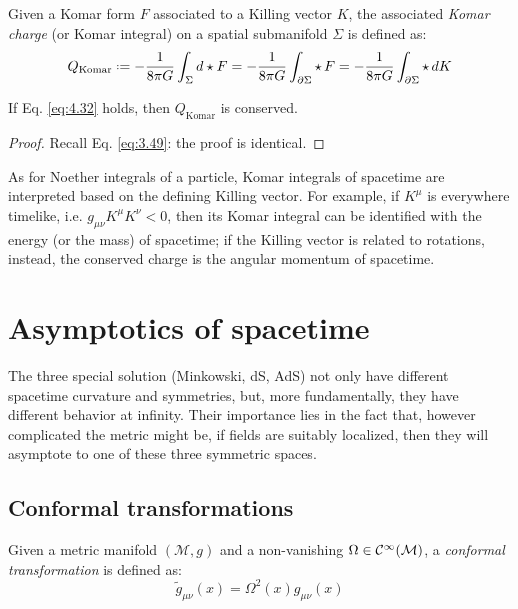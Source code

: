 \begin{definition}
  Given a Komar form $ F $ associated to a Killing vector $ K $, the associated \textit{Komar charge} (or Komar integral) on a spatial submanifold $ \Sigma $ is defined as:
  \begin{equation}
    Q_{\text{Komar}} \defeq - \frac{1}{8\pi G} \int_\Sigma d \star F = - \frac{1}{8\pi G} \int_{\pa \Sigma} \star\, F = - \frac{1}{8\pi G} \int_{\pa \Sigma} \star\, dK
    \label{eq:4.33}
  \end{equation}
\end{definition}

\begin{proposition}
  If Eq. \ref{eq:4.32} holds, then $ Q_{\text{Komar}} $ is conserved.
\end{proposition}
\begin{proof}
  Recall Eq. \ref{eq:3.49}: the proof is identical.
\end{proof}

As for Noether integrals of a particle, Komar integrals of spacetime are interpreted based on the defining Killing vector. For example, if $ K^\mu $ is everywhere timelike, i.e. $ g_{\mu \nu} K^\mu K^\nu < 0 $, then its Komar integral can be identified with the energy (or the mass) of spacetime; if the Killing vector is related to rotations, instead, the conserved charge is the angular momentum of spacetime.

\section{Asymptotics of spacetime}

The three special solution (Minkowski, dS, AdS) not only have different spacetime curvature and symmetries, but, more fundamentally, they have different behavior at infinity. Their importance lies in the fact that, however complicated the metric might be, if fields are suitably localized, then they will asymptote to one of these three symmetric spaces.

\subsection{Conformal transformations}

\begin{definition}
  Given a metric manifold $ (\mathcal{M},g) $ and a non-vanishing $ \Omega \in \mathcal{C}^{\infty}(\mathcal{M}) $, a \textit{conformal transformation} is defined as:
  \begin{equation}
    \tilde{g}_{\mu \nu}(x) = \Omega^2(x) g_{\mu \nu}(x)
    \label{eq:4.34}
  \end{equation}
\end{definition}

